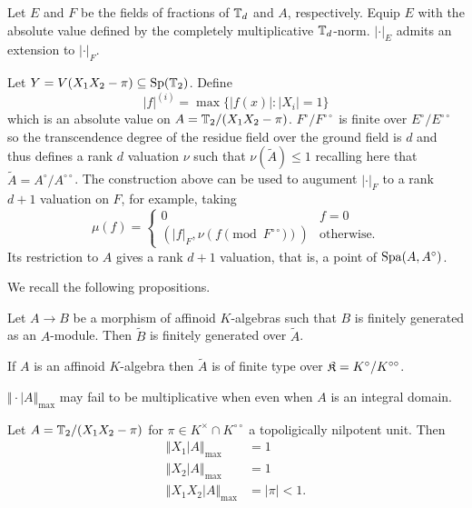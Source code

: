 Let $E$ and $F$ be the fields of fractions of $\mathbb{T}_{d}$ and $A$, respectively. Equip $E$ with the absolute value defined by the completely multiplicative $\mathbb{T}_{d}$-norm. $|\cdot|_{E}$ admits an extension to $|\cdot|_{F}$. 
\begin{example}
    Let $Y=V(X_{1}X_{2}-\pi)\subseteq\mathrm{Sp}(\mathbb{T}_{2})$. Define 
    $$|f|^{(i)}=\max\{|f(x)|:|X_{i}|=1\}$$ 
    which is an absolute value on $A=\mathbb{T}_{2}/(X_{1}X_{2}-\pi)$. $F^{\circ}/F^{\circ\circ}$ is finite over $E^{\circ}/E^{\circ\circ}$ so the transcendence degree of the residue field over the ground field is $d$ and thus defines a rank $d$ valuation $\nu$ such that $\nu(\widetilde{A})\leq 1$ recalling here that $\widetilde{A}=A^{\circ}/A^{\circ\circ}$. The construction above can be used to augument $|\cdot|_{F}$ to a rank $d+1$ valuation on $F$, for example, taking 
    $$\mu(f)=\begin{cases}
        0 & f=0 \\ (|f|_{F},\nu(f\pmod F^{\circ\circ})) & \text{otherwise.}
    \end{cases}$$
    Its restriction to $A$ gives a rank $d+1$ valuation, that is, a point of $\mathrm{Spa}(A,A^{\circ})$. 
\end{example}
We recall the following propositions. 
\begin{proposition}
    Let $A\to B$ be a morphism of affinoid $K$-algebras such that $B$ is finitely generated as an $A$-module. Then $\widetilde{B}$ is finitely generated over $\widetilde{A}$. 
\end{proposition}
\begin{corollary}
    If $A$ is an affinoid $K$-algebra then $\widetilde{A}$ is of finite type over $\mathfrak{K}=K^{\circ}/K^{\circ\circ}$.
\end{corollary}
\begin{example}
    $\Vert\cdot|A\Vert_{\max}$ may fail to be multiplicative when even when $A$ is an integral domain. 
\end{example}
\begin{example}
    Let $A=\mathbb{T}_{2}/(X_{1}X_{2}-\pi)$ for $\pi\in K^{\times}\cap K^{\circ\circ}$ a topoligically nilpotent unit. Then 
    \begin{align*}
        \Vert X_{1}|A\Vert_{\max}&=1 \\
        \Vert X_{2}|A\Vert_{\max}&=1 \\
        \Vert X_{1}X_{2}|A\Vert_{\max} &= |\pi|<1.
    \end{align*}
\end{example}
